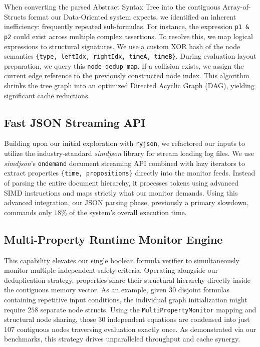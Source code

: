\documentclass[a4paper,12pt]{report}
\begin{document}
When converting the parsed Abstract Syntax Tree into the contiguous Array-of-Structs format our Data-Oriented system expects, we identified an inherent inefficiency: frequently repeated sub-formulas. For instance, the expression \texttt{p1 \& p2} could exist across multiple complex assertions. 
To resolve this, we map logical expressions to structural signatures. We use a custom XOR hash of the node semantics \texttt{\{type, leftIdx, rightIdx, timeA, timeB\}}. During evaluation layout preparation, we query this \texttt{node\_dedup\_map}. If a collision exists, we assign the current edge reference to the previously constructed node index. This algorithm shrinks the tree graph into an optimized Directed Acyclic Graph (DAG), yielding significant cache reductions.

\subsection{Fast JSON Streaming API}
Building upon our initial exploration with \texttt{ryjson}, we refactored our inputs to utilize the industry-standard \textit{simdjson} library for stream loading log files. We use \textit{simdjson}'s \texttt{ondemand} document streaming API combined with lazy iterators to extract properties \texttt{\{time, propositions\}} directly into the monitor feeds. Instead of parsing the entire document hierarchy, it processes tokens using advanced SIMD instructions and maps strictly what our monitor demands. Using this advanced integration, our JSON parsing phase, previously a primary slowdown, commands only $18\%$ of the system's overall execution time.

\subsection{Multi-Property Runtime Monitor Engine}
This capability elevates our single boolean formula verifier to simultaneously monitor multiple independent safety criteria. Operating alongside our deduplication strategy, properties share their structural hierarchy directly inside the contiguous memory vector. As an example, given $30$ disjoint formulas containing repetitive input conditions, the individual graph initialization might require $258$ separate node structs. Using the \texttt{MultiPropertyMonitor} mapping and structural node sharing, those $30$ independent equations are condensed into just $107$ contiguous nodes traversing evaluation exactly once. As demonstrated via our benchmarks, this strategy drives unparalleled throughput and cache synergy.
\end{document}
